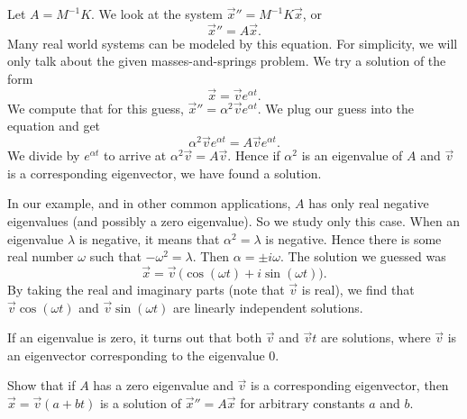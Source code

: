 \medskip

Let $A = M^{-1}K$.  We look at the system
${\vec{x}}'' = M^{-1}K \vec{x}$, or
\begin{equation*}
{\vec{x}}'' = A \vec{x} .
\end{equation*}
Many real world systems can be modeled by this equation.  For simplicity,
we will only talk about the
given masses-and-springs problem.  We try a solution of the form
\begin{equation*}
\vec{x} = \vec{v} e^{\alpha t} .
\end{equation*}
We compute that for this guess,
${\vec{x}}'' = \alpha^2 \vec{v} e^{\alpha t}$.
We plug our guess into the equation and get
\begin{equation*}
\alpha^2 \vec{v} e^{\alpha t} = A\vec{v} e^{\alpha t} .
\end{equation*}
We divide by $e^{\alpha t}$ to arrive at
$\alpha^2 \vec{v} = A\vec{v}$.  Hence if $\alpha^2$ is an eigenvalue
of $A$ and $\vec{v}$ is a corresponding eigenvector, we have found
a solution.

In our example, and in other common applications,
$A$ has only real negative
eigenvalues (and possibly a zero eigenvalue).  So we study only this
case.  When an eigenvalue $\lambda$ is negative, it means that
$\alpha^2 = \lambda$ is negative.  Hence there is some real number $\omega$
such that $-\omega^2 = \lambda$.  Then $\alpha = \pm i \omega$.
The solution we guessed was
\begin{equation*}
\vec{x} = \vec{v} \, \bigl(\cos (\omega t) + i \sin (\omega t) \bigr) .
\end{equation*}
By taking the real and imaginary parts (note that $\vec{v}$ is real), we
find that 
$\vec{v} \cos (\omega t)$ and
$\vec{v} \sin (\omega t)$ are linearly independent solutions.

If an eigenvalue is zero, it turns out that both $\vec{v}$ and $\vec{v} t$ are
solutions, where $\vec{v}$ is an eigenvector corresponding to the eigenvalue
0.

\begin{exercise}
Show that if $A$ has a zero eigenvalue and $\vec{v}$ is a
corresponding eigenvector, then $\vec{x} = \vec{v} (a + bt)$ is a solution
of ${\vec{x}}'' = A \vec{x}$ for
arbitrary constants $a$ and $b$.
\end{exercise}

